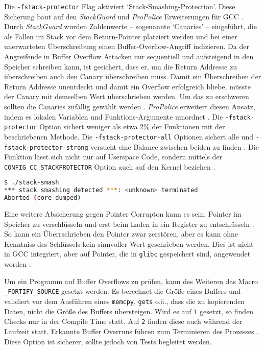 Die \texttt{-fstack-protector} Flag aktiviert `Stack-Smashing-Protection'. 
Diese Sicherung baut auf den \textit{StackGuard} und \textit{ProPolice} Erweiterungen für GCC \cite{stackguard, shacham_2004}.
Durch \textit{StackGuard} wurden Zahlenwerte -- sogenannte `Canaries' -- eingeführt, die als Fallen im Stack vor dem Return-Pointer platziert werden und bei einer unerwarteten Überschreibung einen Buffer-Overflow-Angriff indizieren. Da der Angreifende in Buffer Overflow Attacken nur sequentiell und aufsteigend in den Speicher schreiben kann, ist gesichert, dass er, um die Return Addresse zu überschreiben auch den Canary überschreiben muss. Damit ein Überschreiben der Return Addresse unentdeckt und damit ein Overflow erfolgreich bliebe, müsste der Canary mit demselben Wert überschrieben werden. Um das zu erschweren sollten die Canaries zufällig gewählt werden \cite{stackguard}. 
\textit{ProPolice} erweitert diesen Ansatz, indem es lokalen Variablen und Funktions-Argumente umordnet \cite{shacham_2004}.
Die \texttt{-fstack-protector} Option sichert weniger als etwa 2\% der Funktionen mit der beschriebenen Methode. Die \texttt{-fstack-protector-all} Optionen sichert alle und \texttt{-fstack-protector-strong} versucht eine Balance zwischen beiden zu finden \cite{stack-protector-strong}.
Die Funktion lässt sich nicht nur auf Userspace Code, sondern mittels der \texttt{CONFIG\_CC\_STACKPROTECTOR} Option auch auf den Kernel beziehen \cite{ubuntu-security-features}.

\begin{lstlisting}[language=bash]
$ ./stack-smash
*** stack smashing detected ***: <unknown> terminated
Aborted (core dumped)
\end{lstlisting}

Eine weitere Absicherung gegen Pointer Corrupton kann es sein, Pointer im Speicher zu verschlüsseln und erst beim Laden in ein Register zu entschlüsseln \cite{pointguard}. So kann ein Überrschrieben den Pointer zwar zerstören, aber es kann ohne Kenntniss des Schlüssels kein sinnvoller Wert geschrieben werden. Dies ist nicht in GCC integriert, aber auf Pointer, die in \texttt{glibc} gespeichert sind, angewendet worden \cite{ubuntu-security-features}.

Um ein Programm auf Buffer Overflows zu prüfen, kann des Weiteren das Macro \texttt{\_FORTIFY\_SOURCE} gesetzt werden. Es berechnet die Größe eines Buffers und validiert vor dem Ausführen eines \texttt{memcpy}, \texttt{gets} o.ä., dass die zu kopierenden Daten, nicht die Größe des Buffers übersteigen.
Wird es auf \texttt{1} gesetzt, so finden Checks nur in der Compile Time statt. Auf \texttt{2} finden diese auch während der Laufzeit statt. Erkannte Buffer Overruns führen zum Terminieren des Prozesses \cite{man-fortify}. Diese Option ist sicherer, sollte jedoch von Tests begleitet werden. 

